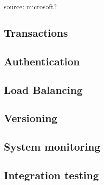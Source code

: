 source: microsoft?

\subsection{Transactions}
\label{subsec:transactions}

\subsection{Authentication}
\label{subsec:authentication}

\subsection{Load Balancing}
\label{subsec:loadBalancing}

\subsection{Versioning}
\label{subsec:versioning}

\subsection{System monitoring}
\label{subsec:systemMonitoring}

\subsection{Integration testing}
\label{subsec:integrationTesting}

